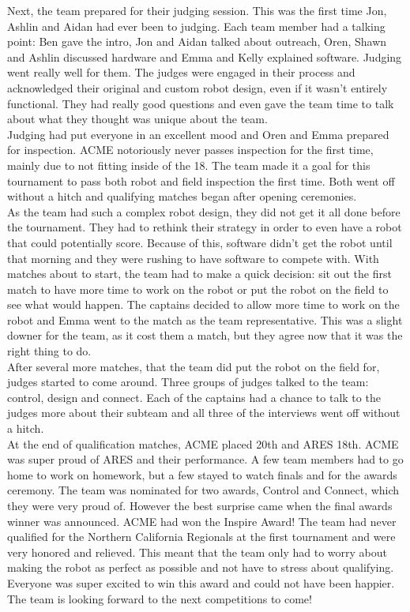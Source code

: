 \documentclass{article}
\begin{document}
Next, the team prepared for their judging session. This was the first time Jon, Ashlin and Aidan had ever been to judging. Each team member had a talking point: Ben gave the intro, Jon and Aidan talked about outreach, Oren, Shawn and Ashlin discussed hardware and Emma and Kelly explained software. Judging went really well for them. The judges were engaged in their process and acknowledged their original and custom robot design, even if it wasn't entirely functional. They had really good questions and even gave the team time to talk about what they thought was unique about the team. \\

Judging had put everyone in an excellent mood and Oren and Emma prepared for inspection. ACME notoriously never passes inspection for the first time, mainly due to not fitting inside of the 18. The team made it a goal for this tournament to pass both robot and field inspection the first time. Both went off without a hitch and qualifying matches began after opening ceremonies. \\

As the team had such a complex robot design, they did not get it all done before the tournament. They had to rethink their strategy in order to even have a robot that could potentially score. Because of this, software didn't get the robot until that morning and they were rushing to have software to compete with. With matches about to start, the team had to make a quick decision: sit out the first match to have more time to work on the robot or put the robot on the field to see what would happen. The captains decided to allow more time to work on the robot and Emma went to the match as the team representative. This was a slight downer for the team, as it cost them a match, but they agree now that it was the right thing to do. \\

After several more matches, that the team did put the robot on the field for, judges started to come around. Three groups of judges talked to the team: control, design and connect. Each of the captains had a chance to talk to the judges more about their subteam and all three of the interviews went off without a hitch. \\

At the end of qualification matches, ACME placed 20th and ARES 18th. ACME was super proud of ARES and their performance. A few team members had to go home to work on homework, but a few stayed to watch finals and for the awards ceremony. The team was nominated for two awards, Control and Connect, which they were very proud of. However the best surprise came when the final awards winner was announced. ACME had won the Inspire Award! The team had never qualified for the Northern California Regionals at the first tournament and were very honored and relieved. This meant that the team only had to worry about making the robot as perfect as possible and not have to stress about qualifying. Everyone was super excited to win this award and could not have been happier. The team is looking forward to the next competitions to come!\\
\end{document}
